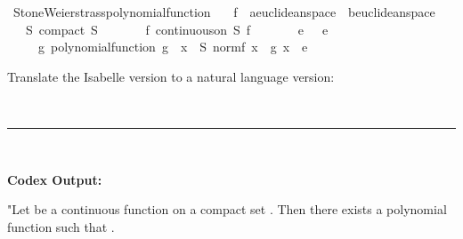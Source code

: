 \documentclass{article}
\begin{document}
\begin{boxB}
\begin{isabelle}
\isamarkupfalse \ Stone{\isacharunderscore}{\kern0pt}Weierstrass{\isacharunderscore}{\kern0pt}polynomial{\isacharunderscore}{\kern0pt}function{\isacharcolon}{\kern0pt}\isanewline
\ \ \ f\ {\isacharcolon}{\kern0pt}{\isacharcolon}{\kern0pt}\ {\isachardoublequoteopen}{\isacharprime}{\kern0pt}a{\isacharcolon}{\kern0pt}{\isacharcolon}{\kern0pt}euclidean{\isacharunderscore}{\kern0pt}space\ {\isasymRightarrow}\ {\isacharprime}{\kern0pt}b{\isacharcolon}{\kern0pt}{\isacharcolon}{\kern0pt}euclidean{\isacharunderscore}{\kern0pt}space{\isachardoublequoteclose}\isanewline
\ \ \ S{\isacharcolon}{\kern0pt}\ {\isachardoublequoteopen}compact\ S{\isachardoublequoteclose}\isanewline
\ \ \ \ \ \ \ f{\isacharcolon}{\kern0pt}\ {\isachardoublequoteopen}continuous{\isacharunderscore}{\kern0pt}on\ S\ f{\isachardoublequoteclose}\isanewline
\ \ \ \ \ \ \ e{\isacharcolon}{\kern0pt}\ {\isachardoublequoteopen}{}\ {\isacharless}{\kern0pt}\ e{\isachardoublequoteclose}\isanewline
\ \ \ \ \ {\isachardoublequoteopen}{\isasymexists}g{\isachardot}{\kern0pt}\ polynomial{\isacharunderscore}{\kern0pt}function\ g\ {\isasymand}\ {\isacharparenleft}{\kern0pt}{\isasymforall}x\ {\isasymin}\ S{\isachardot}{\kern0pt}\ norm{\isacharparenleft}{\kern0pt}f\ x\ {\isacharminus}{\kern0pt}\ g\ x{\isacharparenright}{\kern0pt}\ {\isacharless}{\kern0pt}\ e{\isacharparenright}{\kern0pt}{\isachardoublequoteclose}
\end{isabelle}
Translate the Isabelle version to a natural language version:

\
\hrule
\

\textbf{Codex Output:}

"Let  be a continuous function on a compact set . Then there exists a polynomial function  such that .
\end{boxB}
\end{document}
